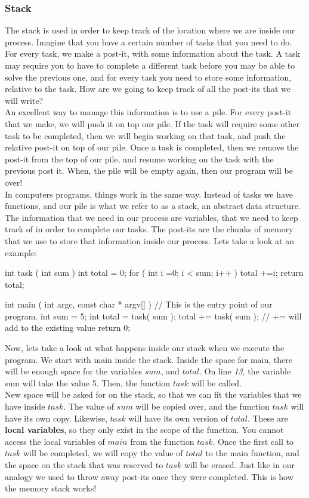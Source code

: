 \documentclass[../notebook.tex]{subfiles}
\begin{document}
\subsubsection{Stack}
The stack is used in order to keep track of the location where we are inside our process. Imagine that you have a certain number of tasks that you need to do. For every task, we make a post-it, with some information about the task. A task may require you to have to complete a different task before you may be able to solve the previous one, and for every task you need to store some information, relative to the task. How are we going to keep track of all the post-its that we will write? \\
An excellent way to manage this information is to use a pile. For every post-it that we make, we will push it on top our pile. If the task will require some other task to be completed, then we will begin working on that task, and push the relative post-it on top of our pile. Once a task is completed, then we remove the post-it from the top of our pile, and resume working on the task with the previous post it. When, the pile will be empty again, then our program will be over! \\
In computers programs, things work in the same way. Instead of tasks we have functions, and our pile is what we refer to as a stack, an abstract data structure. The information that we need in our process are variables, that we need to keep track of in order to complete our tasks. The post-its are the chunks of memory that we use to store that information inside our process. Lets take a look at an example:
\begin{cppcode}
  int task ( int sum )
  {
    int total = 0;
    for ( int i =0; i < sum; i++ )
      total +=i; 
    return total;
  }

  int main ( int argc, const char * argv[] ) 
  { //  This is the entry point of our program.
    int sum = 5;
    int total = task( sum );
    total    += task( sum ); // += will add to the existing value
    return 0; 
  }
\end{cppcode}
Now, lets take a look at what happens inside our stack when we execute the program. We start with main inside the stack. Inside the space for main, there will be enough space for the variables $sum$, and $total$. On line \emph{13}, the variable sum will take the value 5. Then, the function $task$ will be called. \\
New space will be asked for on the stack, so that we can fit the variables that we have inside $task$. The value of $sum$ will be copied over, and the function $task$ will have its own copy. Likewise, $task$ will have its own version of $total$. These are {\bf local variables}, so they only exist in the scope of the function. You cannot access the local variables of  $main$ from the function $task$. Once the first call to $task$ will be completed, we will copy the value of $total$ to the main function, and the space on the stack that was reserved to $task$ will be erased. Just like in our analogy we used to throw away post-its once they were completed. This is how the memory stack works! \\
\end{document}
